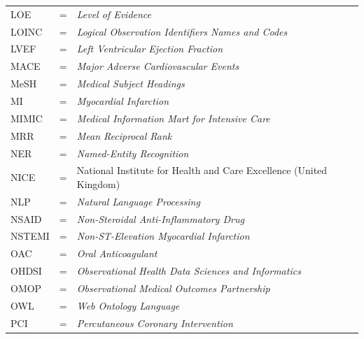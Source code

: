\begin{longtable}{llp{3.6in}}
	LOE     & \hspace{1cm} = & \emph{Level of Evidence} \\
	LOINC   & \hspace{1cm} = & \emph{Logical Observation Identifiers Names and Codes} \\
	LVEF    & \hspace{1cm} = & \emph{Left Ventricular Ejection Fraction} \\
	MACE    & \hspace{1cm} = & \emph{Major Adverse Cardiovascular Events} \\
	MeSH    & \hspace{1cm} = & \emph{Medical Subject Headings} \\
	MI      & \hspace{1cm} = & \emph{Myocardial Infarction} \\
	MIMIC   & \hspace{1cm} = & \emph{Medical Information Mart for Intensive Care} \\
	MRR     & \hspace{1cm} = & \emph{Mean Reciprocal Rank} \\
	NER     & \hspace{1cm} = & \emph{Named-Entity Recognition} \\
	NICE    & \hspace{1cm} = & National Institute for Health and Care Excellence (United Kingdom) \\
	NLP     & \hspace{1cm} = & \emph{Natural Language Processing} \\
	NSAID   & \hspace{1cm} = & \emph{Non-Steroidal Anti-Inflammatory Drug} \\
	NSTEMI  & \hspace{1cm} = & \emph{Non-ST-Elevation Myocardial Infarction} \\
	OAC     & \hspace{1cm} = & \emph{Oral Anticoagulant} \\
	OHDSI   & \hspace{1cm} = & \emph{Observational Health Data Sciences and Informatics} \\
	OMOP    & \hspace{1cm} = & \emph{Observational Medical Outcomes Partnership} \\
	OWL     & \hspace{1cm} = & \emph{Web Ontology Language} \\
	PCI     & \hspace{1cm} = & \emph{Percutaneous Coronary Intervention} \\

\end{longtable}
